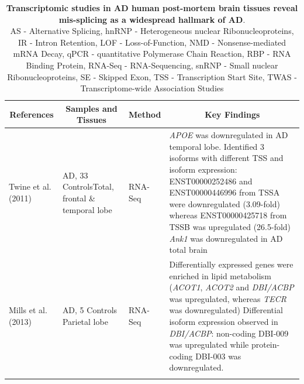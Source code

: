 \begin{changemargin}{1.5cm}
	\begin{landscape}
		\small %
		\setlength\tabcolsep{2pt} %
		\renewcommand{\arraystretch}{1}
		\begin{longtable}[c]{p{3cm}p{4cm}p{3cm}p{16cm}}
			\caption[Transcriptomic studies in AD human post-mortem brain tissues]%
			{\textbf{Transcriptomic studies in AD human post-mortem brain tissues reveal mis-splicing as a widespread hallmark of AD}. \newline AS - Alternative Splicing, hnRNP - Heterogeneous nuclear Ribonucleoproteins, IR - Intron Retention, LOF - Loss-of-Function, NMD - Nonsense-mediated mRNA Decay, qPCR - quantitative Polymerase Chain Reaction, RBP - RNA Binding Protein, RNA-Seq - RNA-Sequencing, snRNP - Small nuclear Ribonucleoproteins, SE - Skipped Exon, TSS - Transcription Start Site, TWAS - Transcriptome-wide Association Studies}
			\label{tab: AS_ADHuman_studies}\\
			
			\toprule
			\multicolumn{1}{c}{References} &
			\multicolumn{1}{c}{Samples and Tissues} &
			\multicolumn{1}{c}{Method} &
			\multicolumn{1}{c}{Key Findings} \\* \midrule
			\endfirsthead
			\endhead
			\bottomrule
			\endfoot
			\endlastfoot
			\centering Twine et al. (2011)\cite{Twine2011} &
			\centering 3 AD, 33 Controls\newline Total, frontal \& temporal lobe &
			\centering RNA-Seq &
			\tabitem \textit{APOE} was downregulated in AD temporal lobe. Identified 3 isoforms with different TSS and isoform expression: ENST00000252486 and ENST00000446996 from TSSA were downregulated (3.09-fold) whereas ENST00000425718 from TSSB was upregulated (26.5-fold) \newline
			\tabitem \textit{Ank1} was downregulated in AD total brain \\
			\hdashline[0.5pt/5pt]
			
			\centering Mills et al. (2013)\cite{Mills2013} &
			\centering 5 AD, 5 Controls \newline Parietal lobe &
			\centering RNA-Seq &
			\tabitem Differentially expressed genes were enriched in lipid metabolism (\textit{ACOT1}, \textit{ACOT2} and  \textit{DBI/ACBP} was upregulated, whereas \textit{TECR} was downregulated) \newline
			\tabitem Differential isoform expression observed in \textit{DBI/ACBP}: non-coding DBI-009 was upregulated while protein-coding DBI-003 was downregulated. \\
			\hdashline[0.5pt/5pt]
			

\end{longtable}
\end{landscape}
\end{changemargin}
